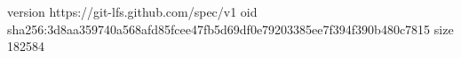 version https://git-lfs.github.com/spec/v1
oid sha256:3d8aa359740a568afd85fcee47fb5d69df0e79203385ee7f394f390b480c7815
size 182584

